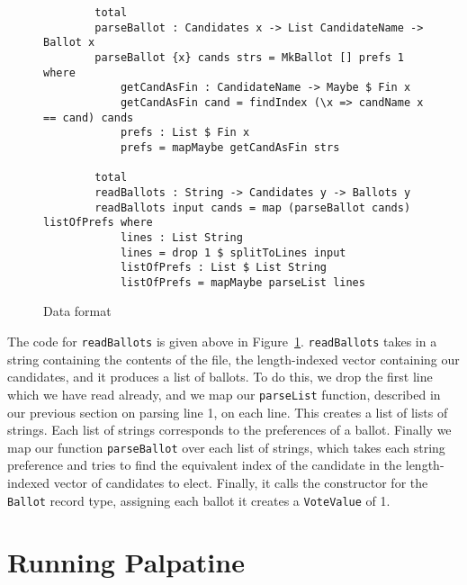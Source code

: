 \begin{figure}[ht!!!!!!!]
    \caption{Data format}
    \label{parse_ballots_code}
    \begin{lstlisting}
        total
        parseBallot : Candidates x -> List CandidateName -> Ballot x
        parseBallot {x} cands strs = MkBallot [] prefs 1 where
            getCandAsFin : CandidateName -> Maybe $ Fin x
            getCandAsFin cand = findIndex (\x => candName x == cand) cands
            prefs : List $ Fin x
            prefs = mapMaybe getCandAsFin strs

        total
        readBallots : String -> Candidates y -> Ballots y
        readBallots input cands = map (parseBallot cands) listOfPrefs where
            lines : List String
            lines = drop 1 $ splitToLines input
            listOfPrefs : List $ List String
            listOfPrefs = mapMaybe parseList lines
    \end{lstlisting}
\end{figure}

The code for \texttt{readBallots} is given above in
Figure~\ref{parse_ballots_code}. \texttt{readBallots} takes in a string
containing the contents of the file, the length-indexed vector containing our
candidates, and it produces a list of ballots. To do this, we drop the first
line which we have read already, and we map our \texttt{parseList} function,
described in our previous section on parsing line 1, on each line. This creates
a list of lists of strings. Each list of strings corresponds to the preferences
of a ballot. Finally we map our function \texttt{parseBallot} over each list of
strings, which takes each string preference and tries to find the equivalent
index of the candidate in the length-indexed vector of candidates to elect.
Finally, it calls the constructor for the \texttt{Ballot} record type, assigning
each ballot it creates a \texttt{VoteValue} of 1. 

\section{Running Palpatine}

